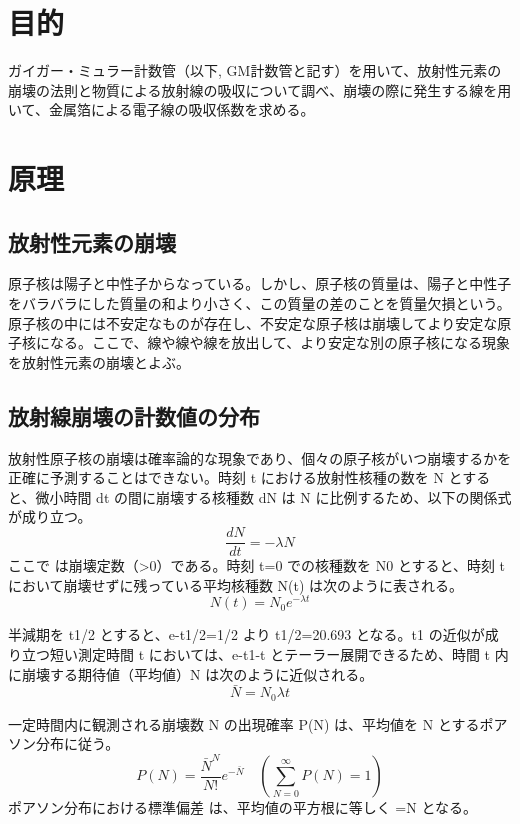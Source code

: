 \documentclass[a4paper,10pt]{jsarticle}
\begin{document}
\section{目的}
ガイガー・ミュラー計数管（以下, GM計数管と記す）を用いて、放射性元素の崩壊の法則と物質による放射線の吸収について調べ、崩壊の際に発生する線を用いて、金属箔による電子線の吸収係数を求める。

\section{原理}

\subsection{放射性元素の崩壊}
原子核は陽子と中性子からなっている。しかし、原子核の質量は、陽子と中性子をバラバラにした質量の和より小さく、この質量の差のことを質量欠損という。原子核の中には不安定なものが存在し、不安定な原子核は崩壊してより安定な原子核になる。ここで、線や線や線を放出して、より安定な別の原子核になる現象を放射性元素の崩壊とよぶ。

\subsection{放射線崩壊の計数値の分布}
放射性原子核の崩壊は確率論的な現象であり、個々の原子核がいつ崩壊するかを正確に予測することはできない。時刻 t における放射性核種の数を N とすると、微小時間 dt の間に崩壊する核種数 dN は N に比例するため、以下の関係式が成り立つ。
\begin{equation}
  \frac{dN}{dt} = -\lambda N
\end{equation}
ここで  は崩壊定数（>0）である。時刻 t=0 での核種数を N0 とすると、時刻 t において崩壊せずに残っている平均核種数 N(t) は次のように表される。
\begin{equation}
  N(t) = N_0 e^{-\lambda t}
\end{equation}

半減期を t1/2 とすると、e-t1/2=1/2 より t1/2=20.693 となる。t1 の近似が成り立つ短い測定時間 t においては、e-t1-t とテーラー展開できるため、時間 t 内に崩壊する期待値（平均値）N は次のように近似される。
\begin{equation}
  \bar{N} = N_0 \lambda t
\end{equation}

一定時間内に観測される崩壊数 N の出現確率 P(N) は、平均値を N とするポアソン分布に従う。
\begin{equation}
  P(N) = \frac{\bar{N}^N}{N!} e^{-\bar{N}} \quad \left( \sum_{N=0}^{\infty} P(N) = 1 \right)
\end{equation}
ポアソン分布における標準偏差  は、平均値の平方根に等しく =N となる。
\end{document}
